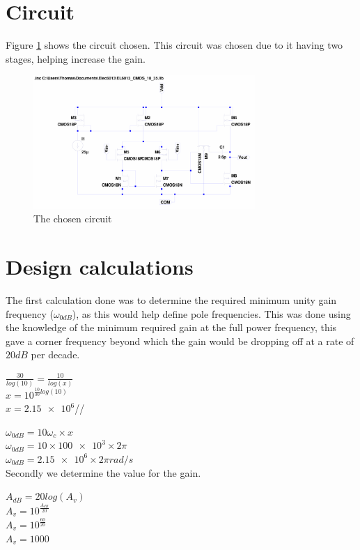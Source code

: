 \newcommand{\parallelsum}{\mathbin{\!/\mkern-5mu/\!}}

\section{Circuit}

Figure \ref{fig:circuit} shows the circuit chosen.
This circuit was chosen due to it having two stages, helping increase the gain.

\begin{figure}[h]
	\centering
	\includegraphics[width=0.75\textwidth]{./images/coursework.pdf}
	\caption{The chosen circuit}
	\label{fig:circuit}
\end{figure}

\section{Design calculations}

The first calculation done was to determine the required minimum unity gain frequency ($\omega_{0dB}$), as this would help define pole frequencies.
This was done using the knowledge of the minimum required gain at the full power frequency, this gave a corner frequency beyond which the gain would be dropping off at a rate of $20dB$ per decade.

$\frac{30}{log(10)} = \frac{10}{log(x)}$ \\
$x = 10^{\frac{10}{30}log(10)}$ \\
$x = \num{2.15e6}$//

$\omega_{0dB} = 10\omega_{c} \times x$ \\
$\omega_{0dB} = 10 \times \num{100e3} \times 2\pi$ \\
$\omega_{0dB} = \num{2.15e6} \times 2\pi rad/s$ \\

Secondly we determine the value for the gain.

$A_{dB} = 20 log(A_{v})$ \\
$A_{v} = 10^{\frac{A_{dB}}{20}}$ \\
$A_{v} = 10^{\frac{60}{20}}$ \\
$A_{v} = 1000$ \\

